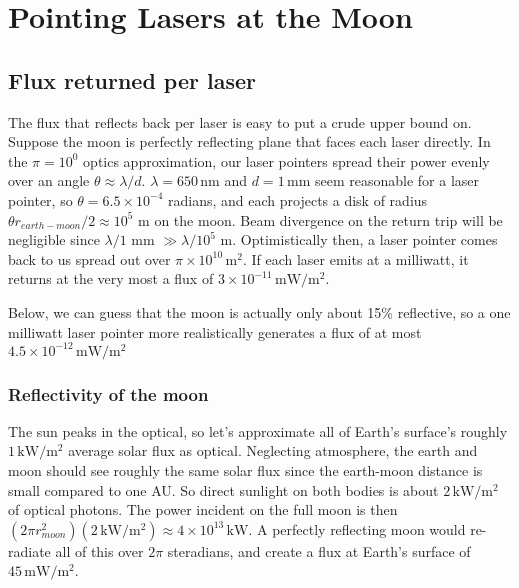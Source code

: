 \documentclass[12pt]{article}
\title{}
\author{}
\date{}
\begin{document}
\maketitle

\section{Pointing Lasers at the Moon}

\subsection{Flux returned per laser}

The flux that reflects back per laser is easy to put a crude upper bound on. Suppose the moon is perfectly reflecting plane that faces each laser directly. In the \(\pi = 10^0\) optics approximation, our laser pointers spread their power evenly over an angle \(\theta \approx \lambda/d\). \(\lambda = 650 \,\mathrm{nm}\) and \(d=1\,\mathrm{mm}\) seem reasonable for a laser pointer, so \(\theta = 6.5 \times 10^{-4}\) radians, and each projects a disk of radius \( \theta r_{earth-moon}/2 \approx 10^5\) m on the moon. Beam divergence on the return trip will be negligible since \(\lambda / 1\) mm \(\gg \lambda / 10^{5}\) m. Optimistically then, a laser pointer comes back to us spread out over \(\pi \times 10^{10} \, \mathrm{m}^2\). If each laser emits at a milliwatt, it returns at the very most a flux of \(3\times 10^{-11} \, \mathrm{mW}/\mathrm{m}^2\).

Below, we can guess that the moon is actually only about 15\% reflective, so a one milliwatt laser pointer more realistically generates a flux of at most \(4.5\times 10^{-12} \, \mathrm{mW}/\mathrm{m}^2\)


\subsubsection{Reflectivity of the moon}

The sun peaks in the optical, so let's approximate all of Earth's surface's roughly \( 1 \, \mathrm{kW} / \mathrm{m}^2\) average solar flux as optical. Neglecting atmosphere, the earth and moon should see roughly the same solar flux since the earth-moon distance is small compared to one AU. So direct sunlight on both bodies is about \( 2 \, \mathrm{kW} / \mathrm{m}^2\) of optical photons. The power incident on the full moon is then \((2\pi r_{moon}^2)( 2 \, \mathrm{kW} / \mathrm{m}^2) \approx 4 \times 10^{13} \,\mathrm{kW} \). A perfectly reflecting moon would re-radiate all of this over \(2\pi\) steradians, and create a flux at Earth's surface of \(45 \,\mathrm{mW} / \mathrm{m}^2\).
\end{document}
